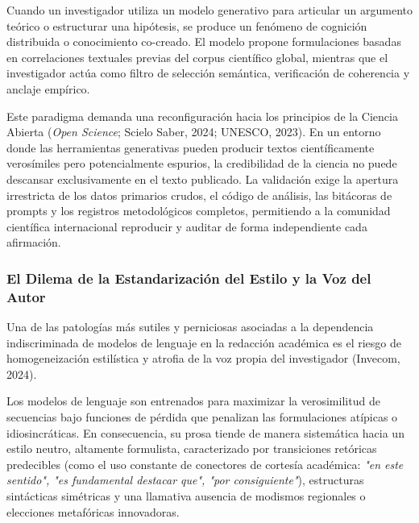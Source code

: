 Cuando un investigador utiliza un modelo generativo para articular un argumento teórico o estructurar una hipótesis, se produce un fenómeno de cognición distribuida o conocimiento co-creado. El modelo propone formulaciones basadas en correlaciones textuales previas del corpus científico global, mientras que el investigador actúa como filtro de selección semántica, verificación de coherencia y anclaje empírico.

Este paradigma demanda una reconfiguración hacia los principios de la Ciencia Abierta (\textit{Open Science}; Scielo Saber, 2024; UNESCO, 2023). En un entorno donde las herramientas generativas pueden producir textos científicamente verosímiles pero potencialmente espurios, la credibilidad de la ciencia no puede descansar exclusivamente en el texto publicado. La validación exige la apertura irrestricta de los datos primarios crudos, el código de análisis, las bitácoras de prompts y los registros metodológicos completos, permitiendo a la comunidad científica internacional reproducir y auditar de forma independiente cada afirmación.

\subsubsection{El Dilema de la Estandarización del Estilo y la Voz del Autor}

Una de las patologías más sutiles y perniciosas asociadas a la dependencia indiscriminada de modelos de lenguaje en la redacción académica es el riesgo de homogeneización estilística y atrofia de la voz propia del investigador (Invecom, 2024).

Los modelos de lenguaje son entrenados para maximizar la verosimilitud de secuencias bajo funciones de pérdida que penalizan las formulaciones atípicas o idiosincráticas. En consecuencia, su prosa tiende de manera sistemática hacia un estilo neutro, altamente formulista, caracterizado por transiciones retóricas predecibles (como el uso constante de conectores de cortesía académica: \textit{"en este sentido", "es fundamental destacar que", "por consiguiente"}), estructuras sintácticas simétricas y una llamativa ausencia de modismos regionales o elecciones metafóricas innovadoras.

